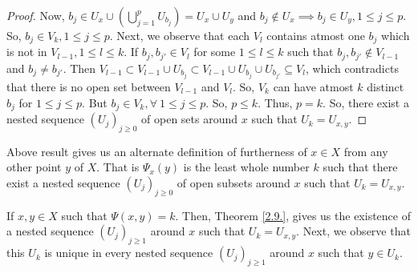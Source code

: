 \documentclass[12pt]{amsart}
\begin{document}
\begin{proof}
	Now, $b_j\in  U_x \cup (\bigcup\limits_{j=1}^p U_{b_j})= U_x\cup U_y$ and $b_j\notin U_x \implies b_j\in U_y,  1\leq j\leq p$.
	So, $b_j\in V_k, 1\leq j\leq p.$ Next, we observe that each  $V_l$ contains atmost one $b_j$ which is not in $V_{l-1}, 1\leq l\leq k$. 
	If $b_j, b_{j'}\in V_l $ for some $1\leq l\leq k$ such that $b_j, b_{j'} \notin V_{l-1}$ and $b_j\neq b_{j'}$. Then $ V_{l-1}\subset  V_{l-1}\cup U_{b_j}\subset V_{l-1}\cup U_{b_j} \cup  U_{b_{j'}} \subseteq V_{l}$, which contradicts that there is no open set between $V_{l-1}$ and $V_l$. So, $V_k$ can have atmost $k$ distinct $b_j$ for $1\leq j\leq p$. But $b_j\in V_k,\forall~ 1\leq j\leq p.$ So, $p\leq k$.
	Thus, $p=k$. So, there exist a nested sequence $(U_j)_{j\geq 0}$ of open sets around $x$ such that $U_k=U_{x,y}$.
\end{proof}

Above result gives us an alternate definition of furtherness of $x\in X$ from any other point $y$ of $X$. That is $\Psi_x(y)$ is the least whole number $k$ such that there exist a nested sequence $(U_j)_{j\geq 0}$ of open subsets around $x$ such that $U_k=U_{x,y}$.\par 
If $x,y\in X$ such that $\Psi(x,y)=k$. Then, Theorem \ref{2.9.}, gives us the existence of a nested sequence $(U_j)_{j\geq1}$ around $x$ such that $U_k=U_{x,y}$. Next, we observe that this $U_k$ is unique in every nested sequence $(U_j)_{j\geq1}$ around $x$ such that $y\in U_k$.
\end{document}
